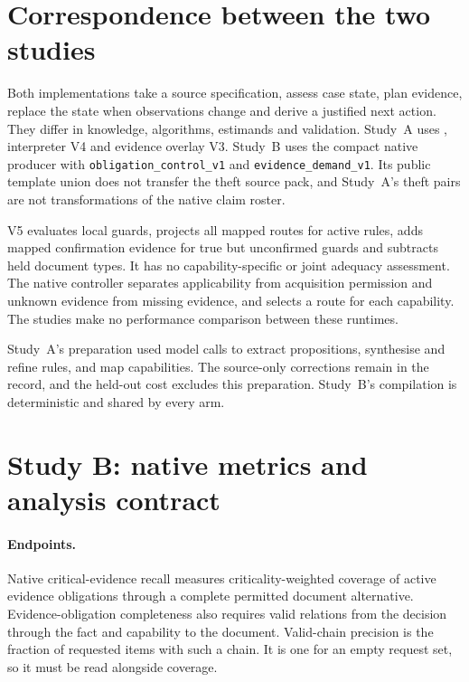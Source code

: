\section{Correspondence between the two studies}
\label{app:correspondence}


Both implementations take a source specification, assess case state, plan
evidence, replace the state when observations change and derive a justified
next action. They differ in knowledge, algorithms, estimands and validation.
Study~A uses , interpreter V4 and
evidence overlay V3. Study~B uses the compact native producer with
\texttt{obligation\_control\_v1} and \texttt{evidence\_demand\_v1}.
Its public template union does not transfer the theft source pack, and
Study~A's theft pairs are not transformations of the native claim roster.

V5 evaluates local guards, projects all mapped routes for active rules,
adds mapped confirmation evidence for true but unconfirmed guards and
subtracts held document types. It has no capability-specific or joint
adequacy assessment. The native controller separates applicability from
acquisition permission and unknown evidence from missing evidence, and
selects a route for each capability. The studies make no performance
comparison between these runtimes.

Study~A's preparation used model calls to extract propositions, synthesise
and refine rules, and map capabilities. The source-only corrections remain
in the record, and the held-out cost excludes this preparation. Study~B's
compilation is deterministic and shared by every arm.

\section{Study B: native metrics and analysis contract}
\label{app:native-metrics}

\paragraph{Endpoints.}
Native critical-evidence recall measures criticality-weighted coverage of
active evidence obligations through a complete permitted document
alternative. Evidence-obligation completeness also requires valid relations
from the decision through the fact and capability to the document.
Valid-chain precision is the fraction of requested items with such a chain.
It is one for an empty request set, so it must be read alongside coverage.

